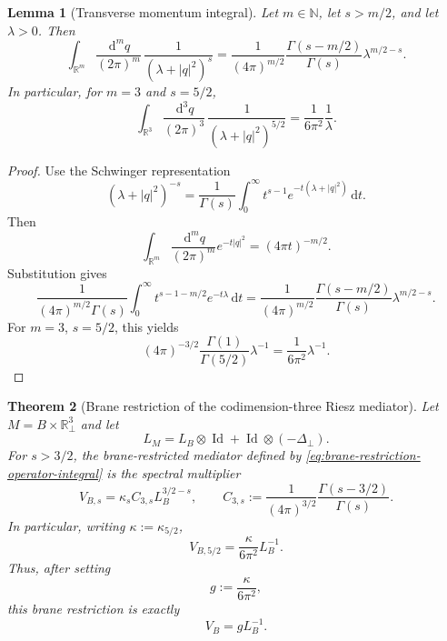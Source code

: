 \documentclass[11pt]{article}
\newtheorem{theorem}{Theorem}[section]
\newtheorem{lemma}[theorem]{Lemma}
\newcommand{\R}{\mathbb{R}}
\newcommand{\Id}{\operatorname{Id}}
\newcommand{\dd}{\,\mathrm{d}}
\begin{document}
\begin{lemma}[Transverse momentum integral]
\label{lem:transverse-integral}
Let $m\in\mathbb{N}$, let $s>m/2$, and let $\lambda>0$.  Then
\begin{equation}
    \int_{\R^m}\frac{\dd^m q}{(2\pi)^m}\,\frac{1}{(\lambda+|q|^2)^s}
    =
    \frac{1}{(4\pi)^{m/2}}\frac{\Gamma(s-m/2)}{\Gamma(s)}\lambda^{m/2-s}.
    \label{eq:transverse-integral-general}
\end{equation}
In particular, for $m=3$ and $s=5/2$,
\begin{equation}
    \int_{\R^3}\frac{\dd^3 q}{(2\pi)^3}\,\frac{1}{(\lambda+|q|^2)^{5/2}}
    =\frac{1}{6\pi^2}\frac{1}{\lambda}.
    \label{eq:transverse-integral-3-5half}
\end{equation}
\end{lemma}

\begin{proof}
Use the Schwinger representation
\[
    (\lambda+|q|^2)^{-s}
    =\frac{1}{\Gamma(s)}\int_0^\infty t^{s-1}e^{-t(\lambda+|q|^2)}\dd t.
\]
Then
\[
    \int_{\R^m}\frac{\dd^mq}{(2\pi)^m}e^{-t|q|^2}
    =(4\pi t)^{-m/2}.
\]
Substitution gives
\[
    \frac{1}{(4\pi)^{m/2}\Gamma(s)}\int_0^\infty t^{s-1-m/2}e^{-t\lambda}\dd t
    =\frac{1}{(4\pi)^{m/2}}\frac{\Gamma(s-m/2)}{\Gamma(s)}\lambda^{m/2-s}.
\]
For $m=3$, $s=5/2$, this yields
\[
    (4\pi)^{-3/2}\frac{\Gamma(1)}{\Gamma(5/2)}\lambda^{-1}
    =\frac{1}{6\pi^2}\lambda^{-1}.
\]
\end{proof}

\begin{theorem}[Brane restriction of the codimension-three Riesz mediator]
\label{thm:brane-restriction}
Let $M=B\times\R^3_\perp$ and let
\[
    L_M=L_B\otimes\Id+\Id\otimes(-\Delta_\perp).
\]
For $s>3/2$, the brane-restricted mediator defined by \eqref{eq:brane-restriction-operator-integral} is the spectral multiplier
\begin{equation}
    V_{B,s}=\kappa_s C_{3,s} L_B^{3/2-s},
    \qquad
    C_{3,s}:=\frac{1}{(4\pi)^{3/2}}\frac{\Gamma(s-3/2)}{\Gamma(s)}.
    \label{eq:VB-general-s}
\end{equation}
In particular, writing $\kappa:=\kappa_{5/2}$,
\begin{equation}
    V_{B,5/2}
    =\frac{\kappa}{6\pi^2}L_B^{-1}.
    \label{eq:brane-restricted-Lminusfivehalf}
\end{equation}
Thus, after setting
\begin{equation}
    g:=\frac{\kappa}{6\pi^2},
    \label{eq:g-kappa-relation}
\end{equation}
this brane restriction is exactly
\begin{equation}
    V_B=gL_B^{-1}.
    \label{eq:VB-gLBminus1}
\end{equation}
\end{theorem}
\end{document}

